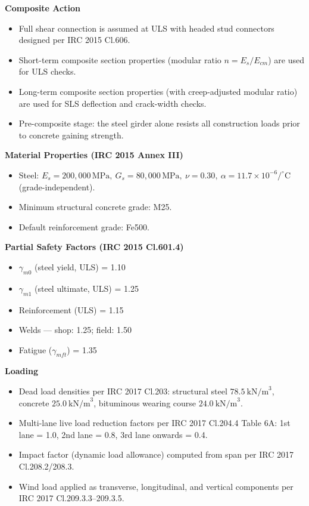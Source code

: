 \documentclass[12pt,a4paper]{report}
\numberwithin{table}{chapter}
\numberwithin{figure}{chapter}
\begin{document}
\textbf{Composite Action}

\begin{itemize}
    \item Full shear connection is assumed at ULS with headed stud connectors designed per IRC 2015 Cl.606.
    \item Short-term composite section properties (modular ratio $n = E_s/E_{cm}$) are used for ULS checks.
    \item Long-term composite section properties (with creep-adjusted modular ratio) are used for SLS deflection and crack-width checks.
    \item Pre-composite stage: the steel girder alone resists all construction loads prior to concrete gaining strength.
\end{itemize}

\textbf{Material Properties (IRC 2015 Annex III)}

\begin{itemize}
\item Steel: $E_s = 200{,}000 \, \text{MPa}, \ G_s = 80{,}000 \, \text{MPa}, \ \nu = 0.30, \ \alpha = 11.7 \times 10^{-6}/^\circ\mathrm{C}$ (grade-independent).
\item Minimum structural concrete grade: M25.
\item Default reinforcement grade: Fe500.
\end{itemize}

\textbf{Partial Safety Factors (IRC 2015 Cl.601.4)}

\begin{itemize}
\item $\gamma_{m0}$ (steel yield, ULS) = 1.10
\item $\gamma_{m1}$ (steel ultimate, ULS) = 1.25
\item Reinforcement (ULS) = 1.15
\item Welds --- shop: 1.25; field: 1.50
\item Fatigue ($\gamma_{mft}$) = 1.35
\end{itemize}

\textbf{Loading}

\begin{itemize}
\item Dead load densities per IRC 2017 Cl.203: structural steel $78.5 \ \text{kN/m}^3$, concrete $25.0 \ \text{kN/m}^3$, bituminous wearing course $24.0 \ \text{kN/m}^3$.
\item Multi-lane live load reduction factors per IRC 2017 Cl.204.4 Table 6A: 1st lane = 1.0, 2nd lane = 0.8, 3rd lane onwards = 0.4.
\item Impact factor (dynamic load allowance) computed from span per IRC 2017 Cl.208.2/208.3.
\item Wind load applied as transverse, longitudinal, and vertical components per IRC 2017 Cl.209.3.3--209.3.5.
\end{itemize}
\end{document}
